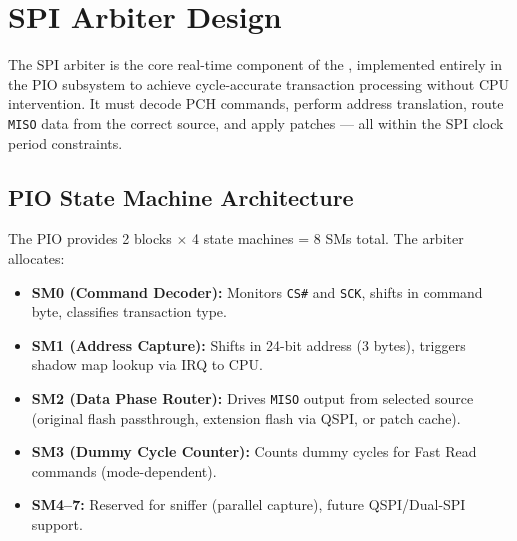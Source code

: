 \section{\ac{SPI} Arbiter Design}
\label{sec:spi_arbiter}

The \ac{SPI} arbiter is the core real-time component of the \vbfc, implemented entirely in the \rp \ac{PIO} subsystem to achieve cycle-accurate transaction processing without CPU intervention. It must decode \ac{PCH} commands, perform address translation, route \texttt{MISO} data from the correct source, and apply patches --- all within the \ac{SPI} clock period constraints.

\subsection{\ac{PIO} State Machine Architecture}
The \rp \ac{PIO} provides 2 blocks $\times$ 4 state machines = 8 SMs total. The arbiter allocates:
\begin{itemize}
    \item \textbf{SM0 (Command Decoder):} Monitors \texttt{CS\#} and \texttt{SCK}, shifts in command byte, classifies transaction type.
    \item \textbf{SM1 (Address Capture):} Shifts in 24-bit address (3 bytes), triggers shadow map lookup via IRQ to CPU.
    \item \textbf{SM2 (Data Phase Router):} Drives \texttt{MISO} output from selected source (original flash passthrough, extension flash via QSPI, or patch cache).
    \item \textbf{SM3 (Dummy Cycle Counter):} Counts dummy cycles for Fast Read commands (mode-dependent).
    \item \textbf{SM4--7:} Reserved for sniffer (parallel capture), future QSPI/Dual-SPI support.
\end{itemize}

